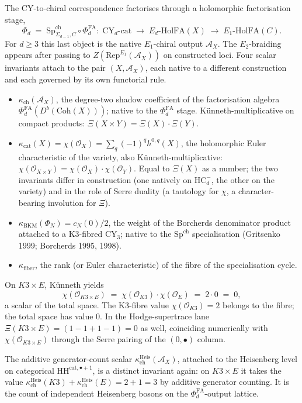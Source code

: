 \documentclass[11pt]{article}
\providecommand{\cA}{\mathcal{A}}
\providecommand{\cO}{\mathcal{O}}
\providecommand{\Coh}{\mathrm{Coh}}
\providecommand{\HH}{\mathrm{HH}}
\begin{document}
The CY-to-chiral correspondence factorises through a holomorphic factorisation
stage,
\[
  \Phi_d \;=\; \mathrm{Sp}^{\mathrm{ch}}_{\Sigma_{d-1},C}\circ\Phi^{\mathrm{FA}}_d
  \colon\;\mathrm{CY}_d\text{-}\mathrm{cat}
  \;\longrightarrow\;E_d\text{-}\mathrm{HolFA}(X)
  \;\longrightarrow\;E_1\text{-}\mathrm{HolFA}(C).
\]
For \(d\ge 3\) this last object is the native \(E_1\)-chiral output
\(\cA_X\). The \(E_2\)-braiding appears after passing to
\(Z(\mathrm{Rep}^{E_1}(\cA_X))\) on constructed loci. Four scalar
invariants attach to the pair \((X,\cA_X)\), each native to a different
construction and each governed by its own functorial rule.
\begin{itemize}
\item $\kappa_{\mathrm{ch}}(\cA_X)$, the degree-two shadow coefficient
      of the factorisation algebra $\Phi^{\mathrm{FA}}_d(D^{b}(\Coh(X)))$;
      native to the $\Phi^{\mathrm{FA}}_d$ stage. K\"unneth-multiplicative
      on compact products: $\Xi(X\times Y)=\Xi(X)\cdot\Xi(Y)$.
\item $\kappa_{\mathrm{cat}}(X)=\chi(\cO_X)=\sum_{q}(-1)^{q}h^{0,q}(X)$,
      the holomorphic Euler characteristic of the variety, also
      K\"unneth-multiplicative:
      $\chi(\cO_{X\times Y})=\chi(\cO_X)\cdot\chi(\cO_Y)$.
      Equal to $\Xi(X)$ as a number; the two invariants differ in
      construction (one natively on $\mathrm{HC}^{-}_{d}$, the other on
      the variety) and in the role of Serre duality (a tautology for
      $\chi$, a character-bearing involution for $\Xi$).
\item $\kappa_{\mathrm{BKM}}(\Phi_N)=c_N(0)/2$, the weight of the
      Borcherds denominator product attached to a K3-fibred CY$_3$;
      native to the $\mathrm{Sp}^{\mathrm{ch}}$ specialisation
      (Gritsenko 1999; Borcherds 1995, 1998).
\item $\kappa_{\mathrm{fiber}}$, the rank (or Euler characteristic)
      of the fibre of the specialisation cycle.
\end{itemize}

On $K3\times E$, K\"unneth yields
\[
   \chi(\cO_{K3\times E})\;=\;\chi(\cO_{K3})\cdot\chi(\cO_E)\;=\;2\cdot 0\;=\;0,
\]
a scalar of the total space. The K3-fibre value
$\chi(\cO_{K3})=2$ belongs to the fibre; the total space has value
$0$. In the Hodge-supertrace lane
$\Xi(K3\times E)=(1-1+1-1)=0$ as well, coinciding numerically with
$\chi(\cO_{K3\times E})$ through the Serre pairing of the
$(0,\bullet)$ column.

The additive generator-count scalar
$\kappa_{\mathrm{ch}}^{\mathrm{Heis}}(\cA_X)$, attached to the
Heisenberg level on categorical $\HH^{\mathrm{cat},\bullet+1}$, is a
distinct invariant again: on $K3\times E$ it takes the value
$\kappa_{\mathrm{ch}}^{\mathrm{Heis}}(K3)+\kappa_{\mathrm{ch}}^{\mathrm{Heis}}(E)=2+1=3$
by additive generator counting. It is the count of independent Heisenberg
bosons on the $\Phi^{\mathrm{FA}}_d$-output lattice.
\end{document}
